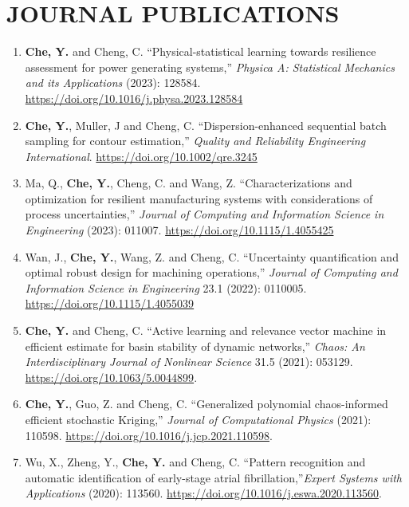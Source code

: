 \documentclass[10pt]{article}
\begin{document}
\section*{JOURNAL PUBLICATIONS}
\begin{enumerate}

	\item {\bf Che, Y.} and Cheng, C. ``Physical-statistical learning towards resilience assessment for power generating systems,'' \textit{Physica A: Statistical Mechanics and its Applications} (2023): 128584. \url{https://doi.org/10.1016/j.physa.2023.128584}
	
	\item {\bf Che, Y.}, Muller, J and Cheng, C. ``Dispersion-enhanced sequential batch sampling for contour estimation,'' \textit{Quality and Reliability Engineering International}. \url{https://doi.org/10.1002/qre.3245}
	
	\item Ma, Q., {\bf Che, Y.}, Cheng, C. and Wang, Z. ``Characterizations and optimization for resilient manufacturing systems with considerations of process uncertainties,'' \textit{Journal of Computing and Information Science in Engineering} (2023): 011007. \url{ https://doi.org/10.1115/1.4055425}
	
	\item Wan, J., {\bf Che, Y.}, Wang, Z. and Cheng, C. ``Uncertainty quantification and optimal robust design for machining operations,'' \textit{Journal of Computing and Information Science in Engineering} 23.1 (2022): 0110005. \url{https://doi.org/10.1115/1.4055039}
	
	\item {\bf Che, Y.} and Cheng, C. ``Active learning and relevance vector machine in efficient estimate for basin stability of dynamic networks,'' \textit{Chaos: An Interdisciplinary Journal of Nonlinear Science} 31.5 (2021): 053129. \url{https://doi.org/10.1063/5.0044899}.
	
	\item {\bf Che, Y.}, Guo, Z. and Cheng, C. ``Generalized polynomial chaos-informed efficient stochastic Kriging,'' \textit{Journal of Computational Physics} (2021): 110598. \url{https://doi.org/10.1016/j.jcp.2021.110598}.
	
	\item Wu, X., Zheng, Y., {\bf Che, Y.} and Cheng, C. ``Pattern recognition and automatic identification of early-stage atrial fibrillation,''\textit{Expert Systems with Applications} (2020): 113560. \url{https://doi.org/10.1016/j.eswa.2020.113560}.
	

\end{enumerate}
\end{document}
